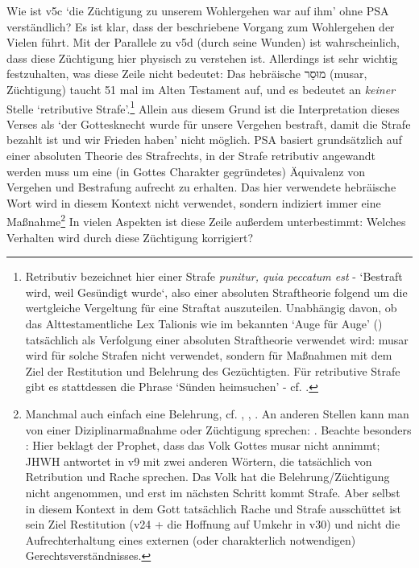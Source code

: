 Wie ist v5c `die Züchtigung zu unserem Wohlergehen war auf ihm' ohne PSA verständlich?
Es ist klar, dass der beschriebene Vorgang zum Wohlergehen der Vielen führt.
Mit der Parallele zu v5d (durch seine Wunden) ist wahrscheinlich, dass diese Züchtigung hier physisch zu verstehen ist.
Allerdings ist sehr wichtig festzuhalten, was diese Zeile nicht bedeutet:
Das hebräische מוּסַר (musar, Züchtigung) taucht 51 mal im Alten Testament auf, und es bedeutet an \textit{keiner} Stelle `retributive Strafe'.\footnote{
	Retributiv bezeichnet hier einer Strafe \textit{punitur, quia peccatum est} - `Bestraft wird, weil Gesündigt wurde`, also einer absoluten Straftheorie folgend
	um die wertgleiche Vergeltung für eine Straftat auszuteilen.
	Unabhängig davon, ob das Alttestamentliche Lex Talionis wie im bekannten `Auge für Auge' () tatsächlich als Verfolgung einer absoluten Straftheorie verwendet wird:
	musar wird für solche Strafen nicht verwendet, sondern für Maßnahmen mit dem Ziel der Restitution und Belehrung des Gezüchtigten.
	Für retributive Strafe gibt es stattdessen die Phrase `Sünden heimsuchen' - cf. .
}
Allein aus diesem Grund ist die Interpretation dieses Verses als `der Gottesknecht wurde für unsere Vergehen bestraft, damit die Strafe bezahlt ist und wir Frieden haben' nicht möglich.
PSA basiert grundsätzlich auf einer absoluten Theorie des Strafrechts, in der Strafe retributiv angewandt werden muss um eine (in Gottes Charakter gegründetes)
Äquivalenz von Vergehen und Bestrafung aufrecht zu erhalten.
Das hier verwendete hebräische Wort wird in diesem Kontext nicht verwendet, sondern indiziert immer eine Maßnahme\footnote{
	Manchmal auch einfach eine Belehrung, cf. , , .
	An anderen Stellen kann man von einer Diziplinarmaßnahme oder Züchtigung sprechen: .
	Beachte besonders : Hier beklagt der Prophet, dass das Volk Gottes musar nicht annimmt;
	JHWH antwortet in v9 mit zwei anderen Wörtern, die tatsächlich von Retribution und Rache sprechen.
	Das Volk hat die Belehrung/Züchtigung nicht angenommen, und erst im nächsten Schritt kommt Strafe.
	Aber selbst in diesem Kontext in dem Gott tatsächlich Rache und Strafe ausschüttet
	ist sein Ziel Restitution (v24 + die Hoffnung auf Umkehr in v30) und nicht die Aufrechterhaltung eines externen (oder charakterlich notwendigen) Gerechtsverständnisses.
}
In vielen Aspekten ist diese Zeile außerdem unterbestimmt: Welches Verhalten wird durch diese Züchtigung korrigiert?
